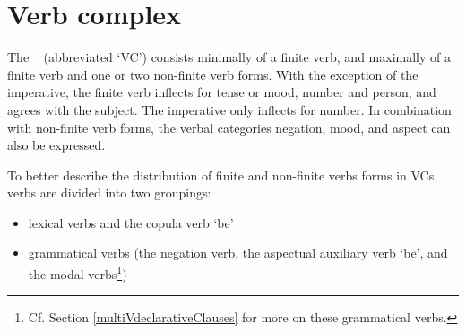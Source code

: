 \section{Verb complex}\label{verbComplex}
The \PS\  (abbreviated ‘VC’) consists minimally of a finite verb, and maximally of a finite verb and one or two non-finite verb forms. 
With the exception of the imperative, the finite verb inflects for tense or mood, number and person, and agrees with the subject. 
The imperative only inflects for number. %
%
In combination with non-finite verb forms, the verbal categories negation, mood, and aspect can also be expressed. 

To better describe the distribution of finite and non-finite verbs forms in VCs, verbs are divided into two groupings: %
\begin{itemize}
\item{lexical verbs and the copula verb  ‘be’}
\item{grammatical verbs (the negation verb, the aspectual auxiliary verb  ‘be’, and the modal verbs\footnote{Cf. Section \ref{multiVdeclarativeClauses} for more on these grammatical verbs.})}
\end{itemize} 

